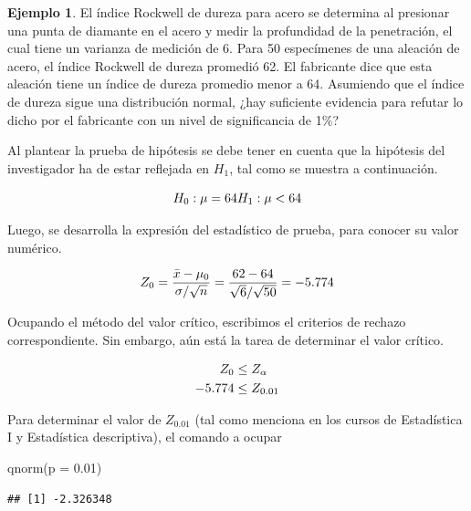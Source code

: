 \documentclass[
]{book}
\newenvironment{Shaded}{\begin{snugshade}}{\end{snugshade}}
\newcommand{\AttributeTok}[1]{\textcolor[rgb]{0.77,0.63,0.00}{#1}}
\newcommand{\FloatTok}[1]{\textcolor[rgb]{0.00,0.00,0.81}{#1}}
\newcommand{\FunctionTok}[1]{\textcolor[rgb]{0.00,0.00,0.00}{#1}}
\newcommand{\NormalTok}[1]{#1}
\theoremstyle{definition}
\theoremstyle{definition}
\newtheorem{example}{Ejemplo}[chapter]
\theoremstyle{definition}
\theoremstyle{definition}
\theoremstyle{remark}
\begin{document}
\begin{example}
El índice Rockwell de dureza para acero se determina al presionar una punta de diamante en el acero y medir la profundidad de la penetración, el cual tiene un varianza de medición de 6. Para 50 especímenes de una aleación de acero, el índice Rockwell de dureza promedió 62. El fabricante dice que esta aleación tiene un índice de dureza promedio menor a 64. Asumiendo que el índice de dureza sigue una distribución normal, ¿hay suficiente evidencia para refutar lo dicho por el fabricante con un nivel de significancia de 1\%?

Al plantear la prueba de hipótesis se debe tener en cuenta que la hipótesis del investigador ha de estar reflejada en \(H_1\), tal como se muestra a continuación.

\begin{equation}
\notag
H_0: \mu = 64\\
H_1: \mu < 64
\end{equation}

Luego, se desarrolla la expresión del estadístico de prueba, para conocer su valor numérico.

\begin{equation}
\notag
Z_0 = \frac{\bar{x} - \mu_0}{\sigma/\sqrt{n}} = \displaystyle\frac{62 - 64}{\sqrt{6}/\sqrt{50}} = -5.774
\end{equation}

Ocupando el método del valor crítico, escribimos el criterios de rechazo correspondiente. Sin embargo, aún está la tarea de determinar el valor crítico.

\begin{equation}
\notag
\begin{split}
Z_0 &\leq Z_{\alpha}\\
-5.774 &\leq Z_{0.01}\\
\end{split}
\end{equation}

Para determinar el valor de \(Z_{0.01}\) (tal como menciona en los cursos de Estadística I y Estadística descriptiva), el comando a ocupar

\begin{Shaded}
\begin{Highlighting}[]
\FunctionTok{qnorm}\NormalTok{(}\AttributeTok{p =} \FloatTok{0.01}\NormalTok{)}
\end{Highlighting}
\end{Shaded}

\begin{verbatim}
## [1] -2.326348
\end{verbatim}


\end{example}
\end{document}

